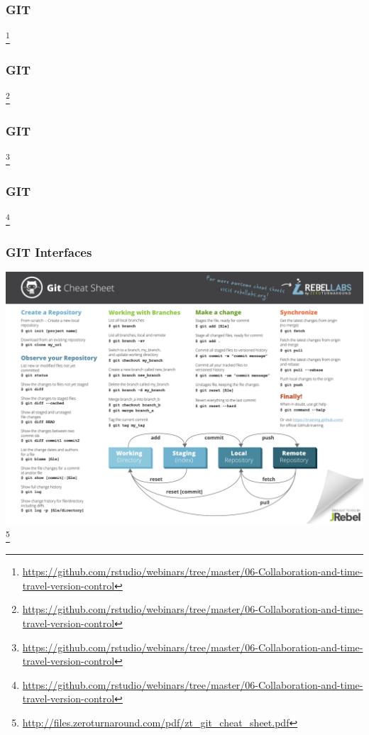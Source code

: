 \documentclass[
t, %
10pt, %
aspectratio=1610, %
ngerman,
english,
]{beamer}
\newcommand\blfootnote[1]{%
  \begingroup
  \renewcommand\thefootnote{}\footnote{#1}%
  \addtocounter{footnote}{-1}%
  \endgroup
}
\begin{document}
\begin{frame}
    \frametitle{GIT}
    
    \blfootnote{\url{https://github.com/rstudio/webinars/tree/master/06-Collaboration-and-time-travel-version-control}}
\end{frame}
\begin{frame}
    \frametitle{GIT}
    
    \blfootnote{\url{https://github.com/rstudio/webinars/tree/master/06-Collaboration-and-time-travel-version-control}}
\end{frame}
\begin{frame}
    \frametitle{GIT}
    
    \blfootnote{\url{https://github.com/rstudio/webinars/tree/master/06-Collaboration-and-time-travel-version-control}}
\end{frame}
\begin{frame}
    \frametitle{GIT}
    
    \blfootnote{\url{https://github.com/rstudio/webinars/tree/master/06-Collaboration-and-time-travel-version-control}}
\end{frame}

\begin{frame}
    \frametitle{GIT Interfaces}
    \centering
    \includegraphics[height=0.8\textheight]{graphics/zt_git_cheat_sheet.pdf}\\
    \blfootnote{\url{http://files.zeroturnaround.com/pdf/zt_git_cheat_sheet.pdf}}
\end{frame}
\end{document}
